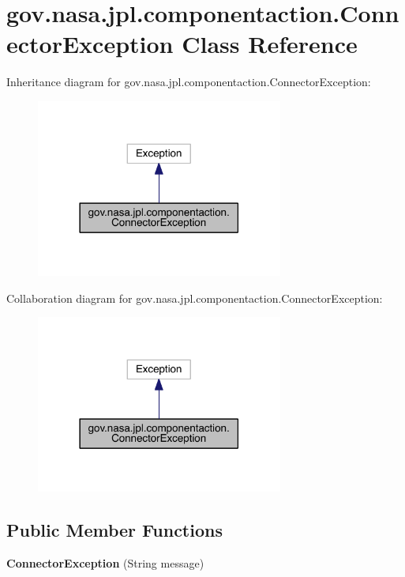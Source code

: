 \section{gov.\+nasa.\+jpl.\+componentaction.\+Connector\+Exception Class Reference}
\label{classgov_1_1nasa_1_1jpl_1_1componentaction_1_1_connector_exception}


Inheritance diagram for gov.\+nasa.\+jpl.\+componentaction.\+Connector\+Exception\+:
\nopagebreak
\begin{figure}[H]
\begin{center}
\leavevmode
\includegraphics[width=230pt]{classgov_1_1nasa_1_1jpl_1_1componentaction_1_1_connector_exception__inherit__graph}
\end{center}
\end{figure}


Collaboration diagram for gov.\+nasa.\+jpl.\+componentaction.\+Connector\+Exception\+:
\nopagebreak
\begin{figure}[H]
\begin{center}
\leavevmode
\includegraphics[width=230pt]{classgov_1_1nasa_1_1jpl_1_1componentaction_1_1_connector_exception__coll__graph}
\end{center}
\end{figure}
\subsection*{Public Member Functions}
\begin{DoxyCompactItemize}
\item 
{\bf Connector\+Exception} (String message)
\end{DoxyCompactItemize}
